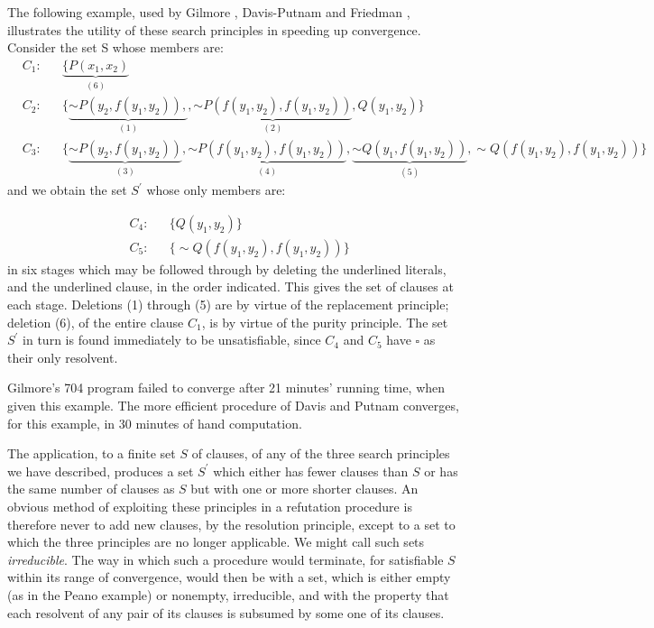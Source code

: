 \documentclass[8pt]{extarticle}
\begin{document}
\newpage

The following example, used by Gilmore \cite{gilmore_1960}, Davis-Putnam \cite{davis_1960} and Friedman \cite{friedman_1963}, illustrates the utility of these search principles in speeding up convergence.\\
\noindent
Consider the set S whose members are: 
\begin{align*}
    & C_1 : && \underbrace{\{P(x_1,x_2)}_{(6)} \\
    & C_2 : && \{\underbrace{\sim P(y_2,f(y_1,y_2)),}_{(1)}, \underbrace{\sim P(f(y_1,y_2),f(y_1,y_2))}_{(2)}, Q(y_1,y_2)\} \\
    & C_3 : && \{\underbrace{\sim P(y_2, f(y_1,y_2))}_{(3)}, \underbrace{\sim P(f(y_1,y_2),f(y_1,y_2))}_{(4)},
        \underbrace{\sim Q(y_1,f(y_1,y_2))}_{(5)}, \sim Q(f(y_1,y_2),f(y_1,y_2))\}
\end{align*}
\noindent
and we obtain the set $S^\prime$ whose only members are:

\begin{align*}
    & C_4 : && \{Q(y_1,y_2)\} \\
    & C_5 : && \{\sim Q(f(y_1, y_2), f(y_1, y_2))\}
\end{align*}
\noindent
in six stages which may be followed through by deleting the underlined literals, and the underlined clause, in the order indicated. This gives the set of clauses at each stage. Deletions (1) through (5) are by virtue of the replacement principle; deletion (6), of the entire clause $C_1$, is by virtue of the purity principle. The set $S^\prime$ in turn is found immediately to be unsatisfiable, since $C_4$ and $C_5$ have $\square$ as their only resolvent.

Gilmore's 704 program failed to converge after 21 minutes' running time, when given this example. The more efficient procedure of Davis and Putnam converges, for this example, in 30 minutes of hand computation.

The application, to a finite set $S$ of clauses, of any of the three search principles we have described, produces a set $S^\prime$ which either has fewer clauses than $S$ or has the same number of clauses as $S$ but with one or more shorter clauses. An obvious method of exploiting these principles in a refutation procedure is therefore never to add new clauses, by the resolution principle, except to a set to which the three principles are no longer applicable. We might call such sets \emph{irreducible}. The way in which such a procedure would terminate, for satisfiable 
$S$ within its range of convergence, would then be with a set, which is either empty (as in the Peano example) or nonempty, irreducible, and with the property that each resolvent of any pair of its clauses is subsumed by some one of its clauses. 
\end{document}
